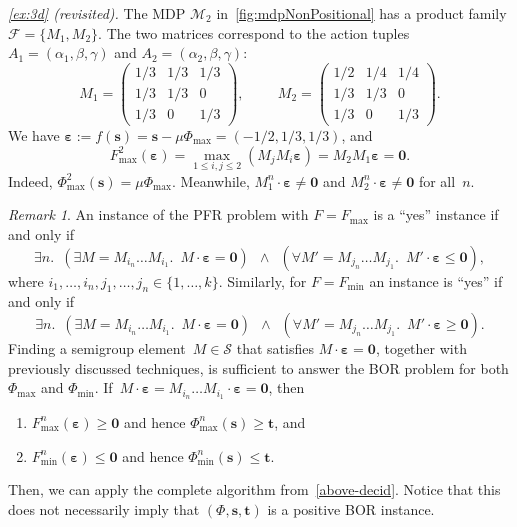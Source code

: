\documentclass[preprint,12pt]{elsarticle}
\theoremstyle{plain}
\theoremstyle{definition}
\theoremstyle{remark}
\newtheorem{remark}[theorem]{Remark}
\theoremstyle{claimstyle}
\newcommand{\mdp}{\mathcal{M}}
\newcommand{\eps}{\bm{\varepsilon}}
\begin{document}
\emph{\cref{ex:3d} (revisited).} The MDP $\mdp_2$ in~\cref{fig:mdpNonPositional} has a product family $\mathcal{F} = \{M_1,M_2\}$. The two matrices correspond to the action tuples $A_1 = (\alpha_1, \beta, \gamma)$ and $A_2 = (\alpha_2, \beta, \gamma)$:
\[M_1 = \begin{pmatrix}
1/3 & 1/3 & 1/3 \\
1/3 & 1/3 & 0\\
1/3 & 0 & 1/3
\end{pmatrix},
\hspace{1cm}
M_2 = \begin{pmatrix}
1/2 & 1/4 & 1/4 \\
1/3 & 1/3 & 0\\
1/3 & 0 & 1/3
\end{pmatrix}.
\]
We have $\eps:= f(\bm{s}) = \bm{s} - \mu\Phi_{\max} = (-1/2, 1/3, 1/3)$, and 
\[F_{\max}^2(\eps) = \max_{1 \leq i, j \leq 2}\left(M_jM_i\eps\right) = M_2 M_1\eps = \bm{0}.\]
Indeed, %
$\Phi_{\max}^2(\bm{s}) = \mu\Phi_{\max}$.
Meanwhile, $M_1^n \cdot \eps \neq \bm{0}$ and $M_2^n \cdot \eps \neq \bm{0}$ for all~$n$.

\begin{remark}\label{not-just-reach}
	An instance of the PFR problem with $F = F_{\max}$ is a ``yes'' instance if and only if 
	\begin{equation*}\label{eps-pre-fp}
		\exists n. \enspace	\left(\exists M = M_{i_n} \dots M_{i_1}. \enspace
		M \cdot \eps = \bm{0} \right) \enspace
		\wedge \enspace
		\left(	\forall M' = M_{j_n} \dots M_{j_1}. \enspace
		M' \cdot \eps \leq \bm{0} \right),	
	\end{equation*}
	where $i_1, \dots, i_n, j_1, \dots, j_n \in \{1, \dots, k\}$. 
	Similarly, for $F = F_{\min}$ an instance is ``yes'' if and only if 
	\begin{equation*}
		\exists n. \enspace	\left(\exists M = M_{i_n} \dots M_{i_1}. \enspace
		M \cdot \eps = \bm{0} \right) \enspace
		\wedge \enspace
		\left(	\forall M' = M_{j_n} \dots M_{j_1}. \enspace
		M' \cdot \eps \geq \bm{0} \right).
	\end{equation*}
Finding a semigroup element~$M \in \mathcal{S}$ that satisfies $M \cdot \eps = \bm{0}$,
	together with previously discussed techniques, 
	is sufficient to answer the BOR problem for both $\Phi_{\max}$ and $\Phi_{\min}$.
	If~$M \cdot \eps = M_{i_n} \dots M_{i_1}  \cdot \eps=\bm{0}$,
	then
	\begin{enumerate}
		\item $F_{\max}^n(\eps) \geq \bm{0}$ and hence $\Phi^n_{\max}(\bm{s}) \geq \bm{t}$, and
		\item $F_{\min}^n(\eps) \leq \bm{0}$ and hence $\Phi^n_{\min}(\bm{s}) \leq \bm{t}$.
	\end{enumerate} Then, we can apply the complete algorithm from~\cref{above-decid}. 
	Notice that this does not necessarily imply that $(\Phi, \bm{s}, \bm{t})$ is a positive BOR instance.
\end{remark}
\end{document}
